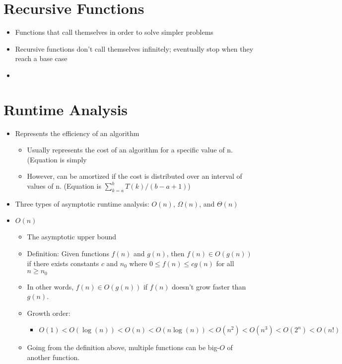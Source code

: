 \documentclass{article}
\begin{document}
\section{Recursive Functions}
\begin{itemize}
    \item Functions that call themselves in order to solve simpler problems
    \item Recursive functions don't call themselves infinitely; eventually stop when they reach a base case
    \item 
\end{itemize}

\section{Runtime Analysis}
\begin{itemize}
    \item Represents the efficiency of an algorithm
    	\begin{itemize}
    		\item Usually represents the cost of an algorithm for a specific value of n. (Equation is simply 
    		\item However, can be amortized if the cost is distributed over an interval of values of n. (Equation is $\sum_{k=a}^{b} T(k) / (b-a+1)$)
    	\end{itemize}
    \item Three types of asymptotic runtime analysis: $O(n)$, $\Omega(n)$, and $\Theta(n)$
    \item $O(n)$
        \begin{itemize}
            \item The asymptotic upper bound
            \item Definition: Given functions $f(n)$ and $g(n)$, then $f(n) \in O(g(n))$ if there exists constants $c$ and $n_0$ where $0 \leq f(n) \leq cg(n)$ for all $n \geq n_0$
            \item In other words, $f(n) \in O(g(n))$ if $f(n)$ doesn't grow faster than $g(n)$.
            \item Growth order:
                \begin{itemize}
                    \item $O(1) < O(\log(n)) < O(n) < O(n \log(n)) < O(n^2) < O(n^3) < O(2^n) < O(n!)$
                \end{itemize}
            \item Going from the definition above, multiple functions can be big-$O$ of another function.

\end{itemize}
\end{itemize}
\end{document}
